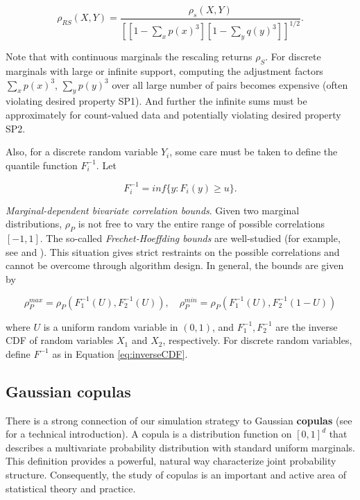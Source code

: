 \documentclass[]{article}
\begin{document}
\begin{equation}
\label{eq:spearmanRescaled}
\rho_{RS}(X,Y) = \frac{\rho_s(X,Y)}{ \left[ \left[ 1 - \sum_x p(x)^3 \right] \left[ 1 - \sum_y q(y)^3 \right] \right]^{1/2}}.
\end{equation}

Note that with continuous marginals the rescaling returns \(\rho_S\).
For discrete marginals with large or infinite support, computing the adjustment factors \(\sum_x p(x)^3\), \(\sum_y p(y)^3\) over all large number of pairs becomes expensive (often violating desired property SP1).
And further the infinite sums must be approximately for count-valued data and potentially violating desired property SP2.

Also, for a discrete random variable \(Y_i\), some care must be taken to define the quantile function \(F_{i}^{-1}\).
Let

\begin{equation}
F_{i}^{-1} = inf\{y:F_{i}(y) \geq u \}.
\label{eq:inverseCDF}
\end{equation}

\emph{Marginal-dependent bivariate correlation bounds}.
Given two marginal distributions, \(\rho_P\) is not free to vary the entire range of possible correlations \([-1,1]\).
The so-called \emph{Frechet-Hoeffding bounds} are well-studied (for example, see \citet{Nelsen2007} and \citet{BF17}).
This situation gives strict restraints on the possible correlations and cannot be overcome through algorithm design.
In general, the bounds are given by

\begin{equation}
\label{eq:frechet}
\rho_P^{max} = \rho_P \left( F^{-1}_1 (U), F^{-1}_2 (U) \right), \quad \rho_P^{min} = \rho_P \left( F^{-1}_1 (U), F^{-1}_2 (1 - U) \right)
\end{equation}

\noindent where \(U\) is a uniform random variable in \((0,1)\), and \(F^{-1}_1, F^{-1}_2\) are the inverse CDF of random variables \(X_1\) and \(X_2\), respectively.
For discrete random variables, define \(F^{-1}\) as in Equation \eqref{eq:inverseCDF}.

\hypertarget{gaussian-copulas}{%
\subsection{Gaussian copulas}\label{gaussian-copulas}}

There is a strong connection of our simulation strategy to Gaussian \textbf{copulas} (see \citet{Nelsen2007} for a technical introduction).
A copula is a distribution function on \([0,1]^d\) that describes a multivariate probability distribution with standard uniform marginals.
This definition provides a powerful, natural way characterize joint probability structure.
Consequently, the study of copulas is an important and active area of statistical theory and practice.
\end{document}
